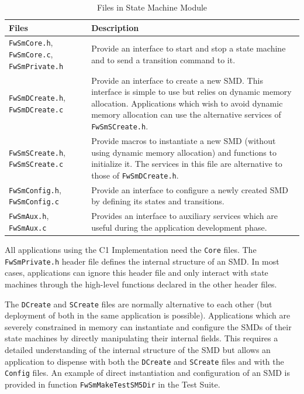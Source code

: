\documentclass[a4paper,10pt]{article}
\begin{document}
\begin{longtable}{|p{2.7cm}|p{8.5cm}|}
\caption{Files in State Machine Module} \label{tab:smModules}\\
\hline
\rowcolor{gray}
\textbf{Files} & \textbf{Description} \\
\hline\hline
\texttt{FwSmCore.h}, \texttt{FwSmCore.c}, \texttt{FwSmPrivate.h} & Provide an interface to start and stop a state 
machine and to send a transition command to it. \\
\hline
\texttt{FwSmDCreate.h}, \texttt{FwSmDCreate.c} & Provide an interface to create a new SMD. This interface is 
simple to use but relies on dynamic memory allocation. Applications which wish to avoid dynamic memory 
allocation can use the alternative services of \texttt{FwSmSCreate.h}. \\ 
\hline
\texttt{FwSmSCreate.h}, \texttt{FwSmSCreate.c} & Provide macros to instantiate a new SMD (without using dynamic 
memory allocation) and functions to initialize it. The services in this file are alternative to those of \texttt{FwSmDCreate.h}. \\ 
\hline
\texttt{FwSmConfig.h}, \texttt{FwSmConfig.c}  & Provide an interface to configure a newly created SMD by defining 
its states and transitions. \\
\hline
\texttt{FwSmAux.h}, \texttt{FwSmAux.c} & Provides an interface to auxiliary services which are useful during 
the application development phase. \\
\hline
\end{longtable}

All applications using the C1 Implementation need the \texttt{Core} files. The \texttt{FwSmPrivate.h} header 
file defines the internal structure of an SMD. In most cases, applications can ignore this header file 
and only interact with state machines through the high-level functions declared in the other header files.

\newpage

The \texttt{DCreate} and \texttt{SCreate} files are normally alternative to each other (but deployment of 
both in the same application is possible). Applications which are severely constrained in memory can instantiate 
and configure the SMDs of their state machines by directly manipulating their internal fields. This requires a 
detailed understanding of the internal structure of the SMD but allows an application to dispense with both 
the \texttt{DCreate} and \texttt{SCreate} files and with the \texttt{Config} files. An example of direct instantiation 
and configuration of an SMD is provided in function \texttt{FwSmMakeTestSM5Dir} in the Test Suite. 
\end{document}
